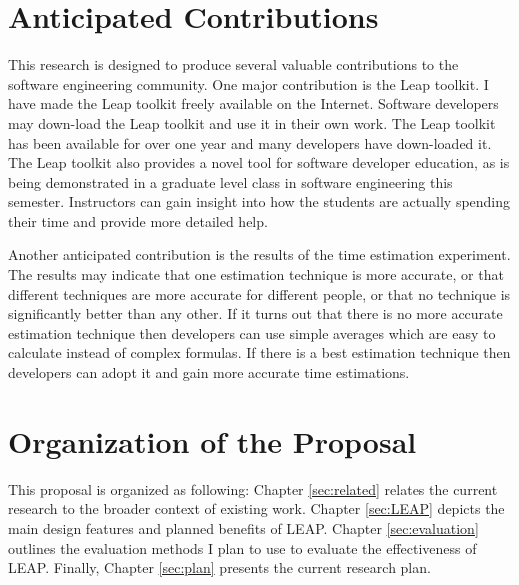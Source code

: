 \section{Anticipated Contributions}

This research is designed to produce several valuable contributions to the
software engineering community.  One major contribution is the Leap toolkit.  I
have made the Leap toolkit freely available on the Internet.  Software
developers may down-load the Leap toolkit and use it in their own work.  The
Leap toolkit has been available for over one year and many developers have
down-loaded it.  The Leap toolkit also provides a novel tool for software
developer education, as is being demonstrated in a graduate level class in
software engineering this semester.  Instructors can gain insight into how the
students are actually spending their time and provide more detailed help.

Another anticipated contribution is the results of the time estimation
experiment.  The results may indicate that one estimation technique is more
accurate, or that different techniques are more accurate for different people,
or that no technique is significantly better than any other. If it turns out
that there is no more accurate estimation technique then developers can use
simple averages which are easy to calculate instead of complex formulas. If
there is a best estimation technique then developers can adopt it and gain more
accurate time estimations.

\section{Organization of the Proposal}


This proposal is organized as following: Chapter \ref{sec:related} relates the
current research to the broader context of existing work. Chapter
\ref{sec:LEAP} depicts the main design features and planned benefits of LEAP.
Chapter \ref{sec:evaluation} outlines the evaluation methods I plan to use to
evaluate the effectiveness of LEAP.  Finally, Chapter \ref{sec:plan} presents
the current research plan.









